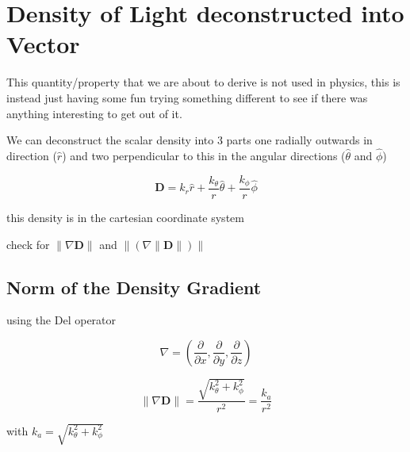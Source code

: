 \section{Density of Light deconstructed into Vector}\label{sect: Field Vector Density}

This quantity/property that we are about to derive is not used in physics, this is instead just having some fun trying something different to see if there was anything interesting to get out of it.

We can deconstruct the scalar density into 3 parts one radially outwards in direction ($\hat{r}$) and two perpendicular to this in the angular directions ($\hat{\theta}$ and $\hat{\phi}$)


\begin{equation}
	\mathbf{D} = k_r \hat{r} + \frac{k_\theta}{r} \hat{\theta} + \frac{k_\phi}{r} \hat{\phi}
\end{equation}

this density is in the cartesian coordinate system

check for $\| \nabla  \mathbf{D} \|$ and $\| ( \nabla  \| \mathbf{D} \| ) \|$

\subsection{Norm of the Density Gradient}\label{subsect: Norm of the Density Gradient}

using the Del operator

\begin{equation}
	\nabla = (\frac{\partial}{\partial x},\frac{\partial}{\partial y},\frac{\partial}{\partial z})
\end{equation}

\begin{equation}
	\| \nabla \mathbf{D} \| = \frac{\sqrt{k_\theta^2 + k_\phi^2 }}{r^2} = \frac{k_{a}}{r^2}
\end{equation}

with $k_{a}=\sqrt{k_\theta^2 + k_\phi^2}$

